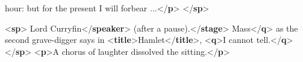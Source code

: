 \begin{shaded}
\hspace*{1em}\hspace*{1em} hour: but for the present I will forbear ...{</\textbf{p}>}\mbox{}\newline 
{</\textbf{sp}>}\end{shaded}\egroup\par \noindent  \par\bgroup{}\exampleFont \begin{shaded}\noindent\mbox{}{<\textbf{sp}>}\mbox{}\newline 
{}Lord Curryfin{</\textbf{speaker}>}\mbox{}\newline 
{}(after a pause).{</\textbf{stage}>}\mbox{}\newline 
{}\mbox{}\newline 
\hspace*{1em}Mass{</\textbf{q}>} as the second grave-digger says\mbox{}\newline 
\hspace*{1em}\hspace*{1em} in {<\textbf{title}>}Hamlet{</\textbf{title}>}, {<\textbf{q}>}I cannot tell.{</\textbf{q}>}\mbox{}\newline 
{}\mbox{}\newline 
{</\textbf{sp}>}\mbox{}\newline 
{<\textbf{p}>}A chorus of laughter dissolved the sitting.{</\textbf{p}>}\end{shaded}\egroup\par 
